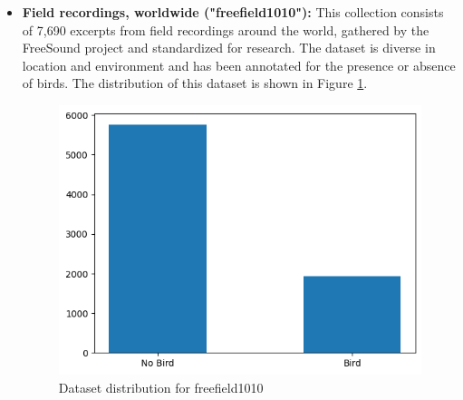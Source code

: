       \begin{itemize}
            \item \textbf{Field recordings, worldwide ("freefield1010"):} This collection consists of 7,690 excerpts from field recordings around the world, gathered by the FreeSound project and standardized for research. The dataset is diverse in location and environment and has been annotated for the presence or absence of birds. The distribution of this dataset is shown in Figure \ref{fig:freefield1010 dataset}.
            \begin{figure}[h!]
                  \centering
                  \includegraphics[scale=0.75]{images/dataset_detection-1.png}
                  \caption{Dataset distribution for freefield1010}
                  \label{fig:freefield1010 dataset}
            \end{figure}


\end{itemize}
